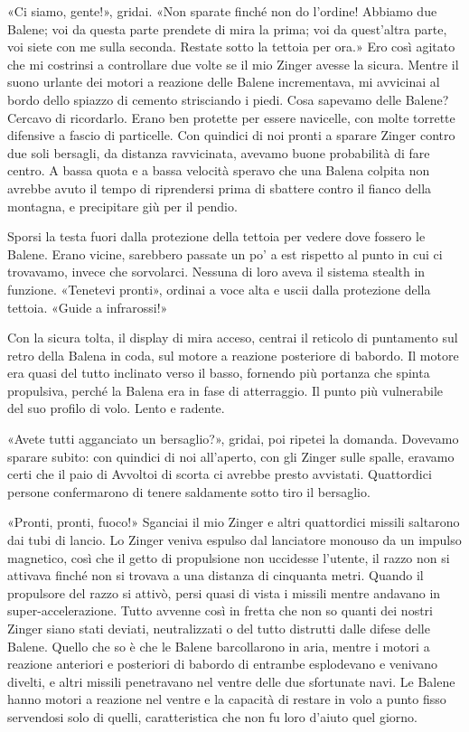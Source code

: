 «Ci siamo, gente!», gridai. «Non sparate finché non do l'ordine! Abbiamo
due Balene; voi da questa parte prendete di mira la prima; voi da
quest'altra parte, voi siete con me sulla seconda. Restate sotto la
tettoia per ora.» Ero così agitato che mi costrinsi a controllare due
volte se il mio Zinger avesse la sicura. Mentre il suono urlante dei
motori a reazione delle Balene incrementava, mi avvicinai al bordo dello
spiazzo di cemento strisciando i piedi. Cosa sapevamo delle Balene?
Cercavo di ricordarlo. Erano ben protette per essere navicelle, con
molte torrette difensive a fascio di particelle. Con quindici di noi
pronti a sparare Zinger contro due soli bersagli, da distanza
ravvicinata, avevamo buone probabilità di fare centro. A bassa quota e a
bassa velocità speravo che una Balena colpita non avrebbe avuto il tempo
di riprendersi prima di sbattere contro il fianco della montagna, e
precipitare giù per il pendio.

Sporsi la testa fuori dalla protezione della tettoia per vedere dove
fossero le Balene. Erano vicine, sarebbero passate un po' a est rispetto
al punto in cui ci trovavamo, invece che sorvolarci. Nessuna di loro
aveva il sistema stealth in funzione. «Tenetevi pronti», ordinai a voce
alta e uscii dalla protezione della tettoia. «Guide a infrarossi!»

Con la sicura tolta, il display di mira acceso, centrai il reticolo di
puntamento sul retro della Balena in coda, sul motore a reazione
posteriore di babordo. Il motore era quasi del tutto inclinato verso il
basso, fornendo più portanza che spinta propulsiva, perché la Balena era
in fase di atterraggio. Il punto più vulnerabile del suo profilo di
volo. Lento e radente.

«Avete tutti agganciato un bersaglio?», gridai, poi ripetei la domanda.
Dovevamo sparare subito: con quindici di noi all'aperto, con gli Zinger
sulle spalle, eravamo certi che il paio di Avvoltoi di scorta ci avrebbe
presto avvistati. Quattordici persone confermarono di tenere saldamente
sotto tiro il bersaglio.

«Pronti, pronti, fuoco!» Sganciai il mio Zinger e altri quattordici
missili saltarono dai tubi di lancio. Lo Zinger veniva espulso dal
lanciatore monouso da un impulso magnetico, così che il getto di
propulsione non uccidesse l'utente, il razzo non si attivava finché non
si trovava a una distanza di cinquanta metri. Quando il propulsore del
razzo si attivò, persi quasi di vista i missili mentre andavano in
super-accelerazione. Tutto avvenne così in fretta che non so quanti dei
nostri Zinger siano stati deviati, neutralizzati o del tutto distrutti
dalle difese delle Balene. Quello che so è che le Balene barcollarono in
aria, mentre i motori a reazione anteriori e posteriori di babordo di
entrambe esplodevano e venivano divelti, e altri missili penetravano nel
ventre delle due sfortunate navi. Le Balene hanno motori a reazione nel
ventre e la capacità di restare in volo a punto fisso servendosi solo di
quelli, caratteristica che non fu loro d'aiuto quel giorno.

